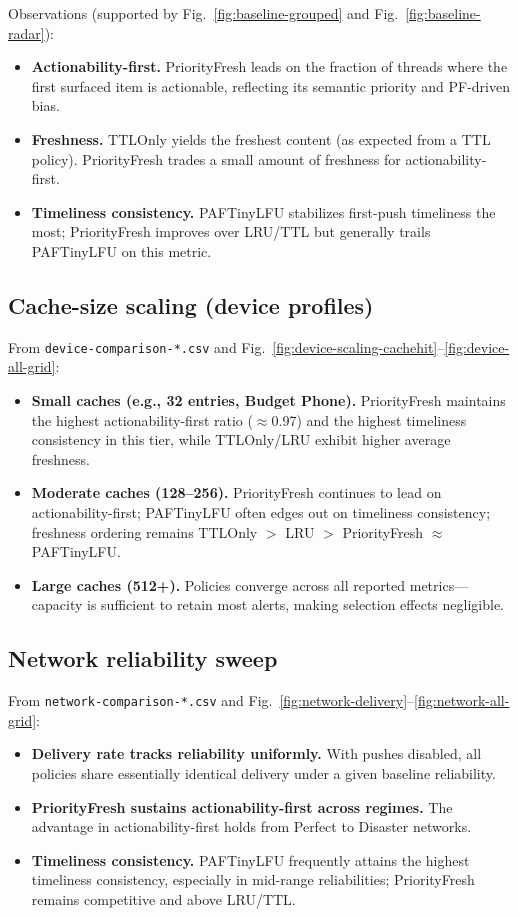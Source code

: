 \documentclass[11pt,twocolumn]{article}
\begin{document}
\noindent Observations (supported by Fig.~\ref{fig:baseline-grouped} and Fig.~\ref{fig:baseline-radar}):
\begin{itemize}
    \item \textbf{Actionability-first.} PriorityFresh leads on the fraction of threads where the first surfaced item is actionable, reflecting its semantic priority and PF-driven bias.
    \item \textbf{Freshness.} TTLOnly yields the freshest content (as expected from a TTL policy). PriorityFresh trades a small amount of freshness for actionability-first.
    \item \textbf{Timeliness consistency.} PAFTinyLFU stabilizes first-push timeliness the most; PriorityFresh improves over LRU/TTL but generally trails PAFTinyLFU on this metric.
\end{itemize}

\subsection{Cache-size scaling (device profiles)}
From \texttt{device-comparison-*.csv} and Fig.~\ref{fig:device-scaling-cachehit}--\ref{fig:device-all-grid}:
\begin{itemize}
    \item \textbf{Small caches (e.g., 32 entries, Budget Phone).} PriorityFresh maintains the highest actionability-first ratio ($\approx$0.97) and the highest timeliness consistency in this tier, while TTLOnly/LRU exhibit higher average freshness.
    \item \textbf{Moderate caches (128--256).} PriorityFresh continues to lead on actionability-first; PAFTinyLFU often edges out on timeliness consistency; freshness ordering remains TTLOnly $>$ LRU $>$ PriorityFresh $\approx$ PAFTinyLFU.
    \item \textbf{Large caches (512+).} Policies converge across all reported metrics—capacity is sufficient to retain most alerts, making selection effects negligible.
\end{itemize}

\subsection{Network reliability sweep}
From \texttt{network-comparison-*.csv} and Fig.~\ref{fig:network-delivery}--\ref{fig:network-all-grid}:
\begin{itemize}
    \item \textbf{Delivery rate tracks reliability uniformly.} With pushes disabled, all policies share essentially identical delivery under a given baseline reliability.
    \item \textbf{PriorityFresh sustains actionability-first across regimes.} The advantage in actionability-first holds from Perfect to Disaster networks.
    \item \textbf{Timeliness consistency.} PAFTinyLFU frequently attains the highest timeliness consistency, especially in mid-range reliabilities; PriorityFresh remains competitive and above LRU/TTL.
\end{itemize}
\end{document}
